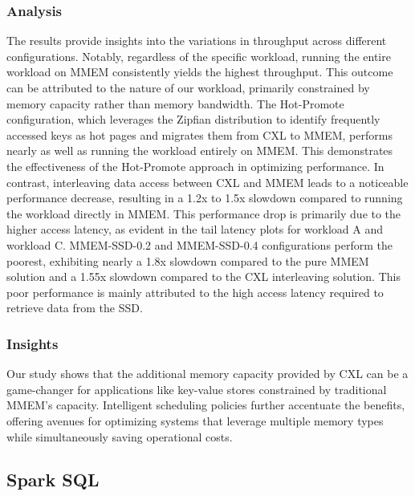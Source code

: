 \subsubsection{Analysis} The results provide insights into the variations in throughput across different configurations. Notably, regardless of the specific workload, running the entire workload on MMEM consistently yields the highest throughput. This outcome can be attributed to the nature of our workload, primarily constrained by memory capacity rather than memory bandwidth. The Hot-Promote configuration, which leverages the Zipfian distribution to identify frequently accessed keys as hot pages and migrates them from CXL to MMEM, performs nearly as well as running the workload entirely on MMEM. This demonstrates the effectiveness of the Hot-Promote approach in optimizing performance. In contrast, interleaving data access between CXL and MMEM leads to a noticeable performance decrease, resulting in a 1.2x to 1.5x slowdown compared to running the workload directly in MMEM. This performance drop is primarily due to the higher access latency, as evident in the tail latency plots for workload A and workload C. MMEM-SSD-0.2 and MMEM-SSD-0.4 configurations perform the poorest, exhibiting nearly a 1.8x slowdown compared to the pure MMEM solution and a 1.55x slowdown compared to the CXL interleaving solution. This poor performance is mainly attributed to the high access latency required to retrieve data from the SSD.

\subsubsection{Insights} Our study shows that the additional memory capacity provided by CXL can be a game-changer for applications like key-value stores constrained by traditional MMEM's capacity. Intelligent scheduling policies further accentuate the benefits, offering avenues for optimizing systems that leverage multiple memory types while simultaneously saving operational costs.




\subsection{Spark SQL}

